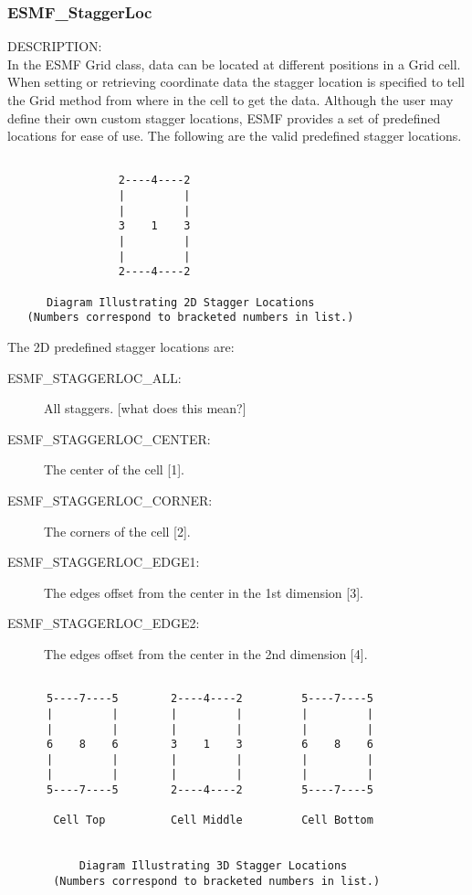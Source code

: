 \subsubsection{ESMF\_StaggerLoc}\label{sec:opt:staggerloc}

 {\sf DESCRIPTION:\\}
 In the ESMF Grid class, data can be located at different positions in a
 Grid cell.  When setting or retrieving coordinate data the stagger location is
 specified to tell the Grid method  from where in the cell to get the data. 
 Although the user may define their own custom stagger locations, 
 ESMF provides a set of predefined locations for ease of use. The
following are the valid predefined stagger locations. 

\medskip

\begin{verbatim}
    
                 2----4----2
                 |         |
                 |         |
                 3    1    3
                 |         |
                 |         |
                 2----4----2
 
      Diagram Illustrating 2D Stagger Locations
   (Numbers correspond to bracketed numbers in list.)

\end{verbatim}

The 2D predefined stagger locations are:\\
\begin{description}
\item [ESMF\_STAGGERLOC\_ALL:] All staggers. [what does this mean?]
\item [ESMF\_STAGGERLOC\_CENTER:] The center of the cell [1].
\item [ESMF\_STAGGERLOC\_CORNER:] The corners of the cell [2].
\item [ESMF\_STAGGERLOC\_EDGE1:] The edges offset from the center in the 1st dimension [3].
\item [ESMF\_STAGGERLOC\_EDGE2:] The edges offset from the center in the 2nd dimension [4].
\end{description}

\medskip

\begin{verbatim}
    
      5----7----5        2----4----2         5----7----5
      |         |        |         |         |         |
      |         |        |         |         |         | 
      6    8    6        3    1    3         6    8    6
      |         |        |         |         |         |
      |         |        |         |         |         |
      5----7----5        2----4----2         5----7----5

       Cell Top          Cell Middle         Cell Bottom
         

           Diagram Illustrating 3D Stagger Locations
       (Numbers correspond to bracketed numbers in list.)

\end{verbatim}

